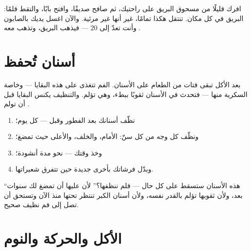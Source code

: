 \begin{example}\label{ex:g1:healthy-habits:glitter}
افرك قليلًا من مسحوق البريق على راحتيك، ثم صافح صديقًا، وافتح
بابًا، والتقط قلمًا: البريق في كل مكان.  تنتقل هكذا
تمامًا، غير أنها غير مرئية. والآن اغسل يديك بالصابون وأنت تعدّ إلى
$20$ --- فيذهب البريق، وتذهب معه .
\end{example}

\section{أسنان تُحفظ}

\begin{proposition}\label{prop:g1:healthy-habits:teeth}
بعد الأكل تبقى فتات من الطعام على الأسنان.  الفم تتغذى على
هذه البقايا --- وخاصة السكرية منها --- فتحدث في الأسنان ثقوبًا
ببطء، وهي تؤلم. والتنظيف يكنس البقايا قبل أن تولم .
\end{proposition}
\admitted

\begin{method}\label{met:g1:healthy-habits:brush}
\begin{enumerate}
  \item نظّف أسنانك بعد الفطور وقبل  --- كل يوم؛
  \item ونظّف كل وجه من كل سنّ: الأمام، والخلف، والأعلى حيث تمضغ؛
  \item وخذ وقتك --- نحو مدة أنشودة؛
  \item وبدّل فرشاتك بأخرى جديدة حين تتفرق شعيراتها.
\end{enumerate}
\end{method}

\begin{remark}\label{rem:g1:healthy-habits:babyteeth}
``هذه الأسنان ستسقط على كل حال --- فلم ننظفها؟'' لأن عليها أن
تمضغ لك سنوات بعد، ولأن ثقوبها تؤلم بالقدر نفسه، ولأن أسنان الكبر
تنتظر تحتها منذ الآن وتستحق أن تصل إلى فم نظيف صحيح.
\end{remark}

\section{الأكل والحركة والنوم}

